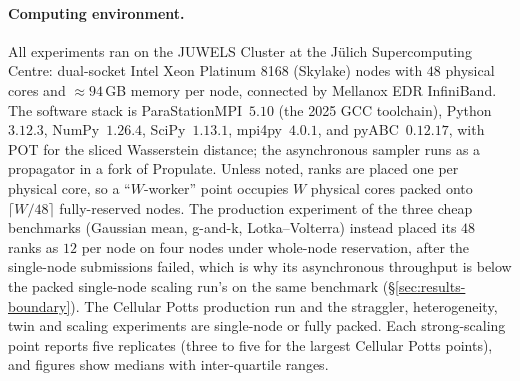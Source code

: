 \documentclass[10pt]{article}
\theoremstyle{plain}
\theoremstyle{definition}
\begin{document}
\paragraph{Computing environment.} All experiments ran on the JUWELS Cluster at the J\"ulich Supercomputing Centre: dual-socket Intel Xeon Platinum 8168 (Skylake) nodes with $48$ physical cores and ${\approx}94$\,GB memory per node, connected by Mellanox EDR InfiniBand. The software stack is ParaStationMPI~$5.10$ (the 2025 GCC toolchain), Python~$3.12.3$, NumPy~$1.26.4$, SciPy~$1.13.1$, mpi4py~$4.0.1$, and pyABC~$0.12.17$, with POT \citep{flamary2021pot} for the sliced Wasserstein distance; the asynchronous sampler runs as a propagator in a fork of Propulate. Unless noted, ranks are placed one per physical core, so a ``$W$-worker'' point occupies $W$ physical cores packed onto $\lceil W/48\rceil$ fully-reserved nodes. The production experiment of the three cheap benchmarks (Gaussian mean, g-and-k, Lotka--Volterra) instead placed its $48$ ranks as $12$ per node on four nodes under whole-node reservation, after the single-node submissions failed, which is why its asynchronous throughput is below the packed single-node scaling run's on the same benchmark (\S\ref{sec:results-boundary}). The Cellular Potts production run and the straggler, heterogeneity, twin and scaling experiments are single-node or fully packed. Each strong-scaling point reports five replicates (three to five for the largest Cellular Potts points), and figures show medians with inter-quartile ranges.
\end{document}
